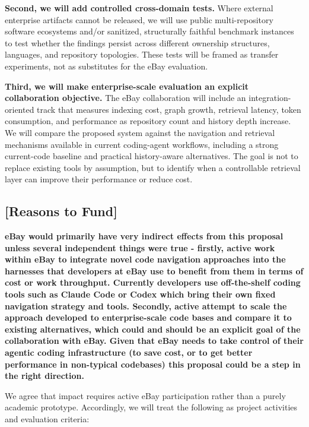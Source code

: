 \documentclass[11pt]{article}
\begin{document}
\textbf{Second, we will add controlled cross-domain tests.} Where external enterprise artifacts cannot be released, we will use public multi-repository software ecosystems and/or sanitized, structurally faithful benchmark instances to test whether the findings persist across different ownership structures, languages, and repository topologies. These tests will be framed as transfer experiments, not as substitutes for the eBay evaluation.

\textbf{Third, we will make enterprise-scale evaluation an explicit collaboration objective.} The eBay collaboration will include an integration-oriented track that measures indexing cost, graph growth, retrieval latency, token consumption, and performance as repository count and history depth increase. We will compare the proposed system against the navigation and retrieval mechanisms available in current coding-agent workflows, including a strong current-code baseline and practical history-aware alternatives. The goal is not to replace existing tools by assumption, but to identify when a controllable retrieval layer can improve their performance or reduce cost.

\subsection*{[Reasons to Fund]}

\textbf{eBay would primarily have very indirect effects from this proposal unless several independent things were true - firstly, active work within eBay to integrate novel code navigation approaches into the harnesses that developers at eBay use to benefit from them in terms of cost or work throughput. Currently developers use off-the-shelf coding tools such as Claude Code or Codex which bring their own fixed navigation strategy and tools. Secondly, active attempt to scale the approach developed to enterprise-scale code bases and compare it to existing alternatives, which could and should be an explicit goal of the collaboration with eBay. Given that eBay needs to take control of their agentic coding infrastructure (to save cost, or to get better performance in non-typical codebases) this proposal could be a step in the right direction.}

We agree that impact requires active eBay participation rather than a purely academic prototype. Accordingly, we will treat the following as project activities and evaluation criteria:
\end{document}
